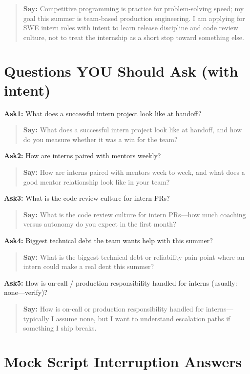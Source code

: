 \documentclass[9pt,a4paper]{article}
\begin{document}
\begin{quote}\small\textbf{Say:} Competitive programming is practice for problem-solving speed; my goal this summer is team-based production engineering. I am applying for SWE intern roles with intent to learn release discipline and code review culture, not to treat the internship as a short stop toward something else.\end{quote}
\vspace{2mm}
\section{Questions YOU Should Ask (with intent)}
\textbf{Ask1:} What does a successful intern project look like at handoff?

\begin{quote}\small\textbf{Say:} What does a successful intern project look like at handoff, and how do you measure whether it was a win for the team?\end{quote}
\vspace{2mm}
\textbf{Ask2:} How are interns paired with mentors weekly?

\begin{quote}\small\textbf{Say:} How are interns paired with mentors week to week, and what does a good mentor relationship look like in your team?\end{quote}
\vspace{2mm}
\textbf{Ask3:} What is the code review culture for intern PRs?

\begin{quote}\small\textbf{Say:} What is the code review culture for intern PRs---how much coaching versus autonomy do you expect in the first month?\end{quote}
\vspace{2mm}
\textbf{Ask4:} Biggest technical debt the team wants help with this summer?

\begin{quote}\small\textbf{Say:} What is the biggest technical debt or reliability pain point where an intern could make a real dent this summer?\end{quote}
\vspace{2mm}
\textbf{Ask5:} How is on-call / production responsibility handled for interns (usually: none---verify)?

\begin{quote}\small\textbf{Say:} How is on-call or production responsibility handled for interns---typically I assume none, but I want to understand escalation paths if something I ship breaks.\end{quote}
\vspace{2mm}
\newpage\section{Mock Script Interruption Answers}
\end{document}
